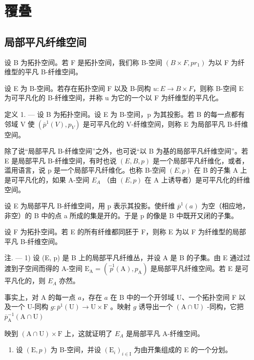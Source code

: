 \section{覆叠}

\subsection{局部平凡纤维空间}

设 B 为拓扑空间。若 F 是拓扑空间，我们称 B-空间 \((B \times F, pr_{1})\) 为以 F 为纤维型的平凡 B-纤维空间。

设 E 为 B-空间。若存在拓扑空间 F 以及 B-同构 \(u: E \rightarrow B \times F\)，则称 B-空间 E 为可平凡化的 B-纤维空间，并称 u 为它的一个以 F 为纤维型的平凡化。

定义 1. --- 设 B 为拓扑空间。设 E 为 B-空间，p 为其投影。若 B 的每一点都有邻域 V 使 \((\overline{p}^{1}(V), p_{V})\) 是可平凡化的 V-纤维空间，则称 E 为局部平凡 B-纤维空间。

除了说“局部平凡 B-纤维空间”之外，也可说“以 B 为基的局部平凡纤维空间”。若 E 是局部平凡 B-纤维空间，有时也说 \((E,B,p)\) 是一个局部平凡纤维化，或者，滥用语言，说 p 是一个局部平凡纤维化。也称 B-空间 \((E,p)\) 在 B 的子集 A 上是可平凡化的，如果 A-空间 \(E_{A}\) （由 \((E,p)\) 在 A 上诱导者）是可平凡化的纤维空间。

设 E 为局部平凡 B-纤维空间，用 p 表示其投影。使纤维 \(\overline{p}^{1}(a)\) 为空（相应地，非空）的 B 中的点 a 所成的集是开的。于是 p 的像是 B 中既开又闭的子集。

设 F 为拓扑空间。若 E 的所有纤维都同胚于 F，则称 E 为以 F 为纤维型的局部平凡 B-纤维空间。

注. --- 1) 设 (E, p) 是 B 上的局部平凡纤维丛，并设 A 是 B 的子集。由 E 通过过渡到子空间而得的 A-空间 \(\mathrm{E}_{\mathrm{A}} = (\stackrel{-1}{p}(\mathrm{A}), p_{\mathrm{A}})\) 是局部平凡纤维空间。若 E 是可平凡化的，则 \(E_{A}\) 亦然。

事实上，对 A 的每一点 \(a\)，存在 \(a\) 在 B 中的一个开邻域 U、一个拓扑空间 F 以及一个 U-同构 \(g\colon \overline{p}^{1}(\mathrm{U})\to \mathrm{U}\times \mathrm{F}\) 。映射 \(g\) 诱导出一个 \((\mathrm{A}\cap \mathrm{U})\) -同构，它把 \(\overline{p}_{\mathrm{A}}^{-1}(\mathrm{A}\cap \mathrm{U})\)

映到 \((\mathrm{A}\cap\mathrm{U})\times\mathrm{F}\) 上，这就证明了 \(E_{A}\) 是局部平凡 A-纤维空间。

\begin{enumerate}
\def\labelenumi{\arabic{enumi})}
\setcounter{enumi}{1}
\tightlist
\item
  设 \((\mathrm{E}, p)\) 为 B-空间，并设 \((\mathrm{E}_{i})_{i \in \mathrm{I}}\) 为由开集组成的 E 的一个分划。
\end{enumerate}

